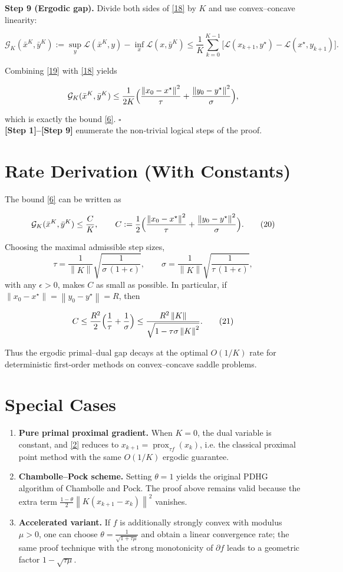 \documentclass{article}
\newcommand{\prox}[2]{\operatorname{prox}_{#1}\!\left(#2\right)}
\newcommand{\norm}[1]{\left\|#1\right\|}
\begin{document}
\noindent\textbf{Step 9 (Ergodic gap).}  
Divide both sides of \eqref{18} by $K$ and use convex–concave linearity:

\[
\mathcal G_{K}(\bar x^{K},\bar y^{K})
:=\sup_{y}\mathcal L(\bar x^{K},y)-\inf_{x}\mathcal L(x,\bar y^{K})
\le
\frac{1}{K}\sum_{k=0}^{K-1}\bigl[\mathcal L(x_{k+1},y^{\star})-\mathcal L(x^{\star},y_{k+1})\bigr].
\tag{19}
\]

Combining \eqref{19} with \eqref{18} yields  

\[
\mathcal G_{K}(\bar x^{K},\bar y^{K})
\le
\frac{1}{2K}\Bigl(\frac{\norm{x_{0}-x^{\star}}^{2}}{\tau}
+\frac{\norm{y_{0}-y^{\star}}^{2}}{\sigma}\Bigr),
\]

which is exactly the bound \eqref{6}.  \hfill $\square$ \\
\textbf{[Step 1]–[Step 9] } enumerate the non‑trivial logical steps of the proof.

\section*{Rate Derivation (With Constants)}
The bound \eqref{6} can be written as  

\[
\mathcal G_{K}(\bar x^{K},\bar y^{K})\le
\frac{C}{K},\qquad 
C:=\frac{1}{2}\Bigl(\frac{\norm{x_{0}-x^{\star}}^{2}}{\tau}
+\frac{\norm{y_{0}-y^{\star}}^{2}}{\sigma}\Bigr).
\tag{20}
\]

Choosing the maximal admissible step sizes,
\[
\tau=\frac{1}{\norm{K}}\sqrt{\frac{1}{\sigma\,(1+\epsilon)}},\qquad
\sigma=\frac{1}{\norm{K}}\sqrt{\frac{1}{\tau\,(1+\epsilon)}},
\]
with any $\epsilon>0$, makes $C$ as small as possible.  In particular, if $\norm{x_{0}-x^{\star}}=\norm{y_{0}-y^{\star}}=R$, then  

\[
C\le \frac{R^{2}}{2}\Bigl(\frac{1}{\tau}+\frac{1}{\sigma}\Bigr)
\le \frac{R^{2}\norm{K}}{\sqrt{1-\tau\sigma\norm{K}^{2}}}.
\tag{21}
\]

Thus the ergodic primal–dual gap decays at the optimal $O(1/K)$ rate for deterministic first‑order methods on convex–concave saddle problems.

\section*{Special Cases}
\begin{enumerate}[nosep]
\item \textbf{Pure primal proximal gradient.}  
When $K=0$, the dual variable is constant, and \eqref{2} reduces to $x_{k+1}= \prox{\tau f}{x_k}$, i.e. the classical proximal point method with the same $O(1/K)$ ergodic guarantee.
\item \textbf{Chambolle–Pock scheme.}  
Setting $\theta=1$ yields the original PDHG algorithm of Chambolle and Pock. The proof above remains valid because the extra term $\frac{1-\theta}{2}\norm{K(x_{k+1}-x_{k})}^{2}$ vanishes.
\item \textbf{Accelerated variant.}  
If $f$ is additionally strongly convex with modulus $\mu>0$, one can choose $\theta=\frac{1}{\sqrt{1+\tau\mu}}$ and obtain a linear convergence rate; the same proof technique with the strong monotonicity of $\partial f$ leads to a geometric factor $1-\sqrt{\tau\mu}$.
\end{enumerate}
\end{document}
